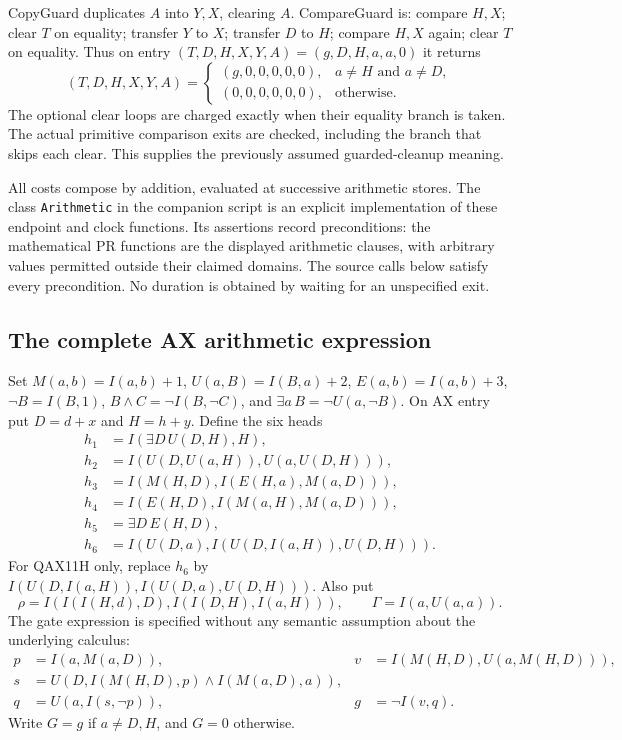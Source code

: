 CopyGuard duplicates $A$ into $Y,X$, clearing $A$.
CompareGuard is: compare $H,X$; clear $T$ on equality; transfer $Y$
to $X$; transfer $D$ to $H$; compare $H,X$ again; clear $T$ on equality.
Thus on entry $(T,D,H,X,Y,A)=(g,D,H,a,a,0)$ it returns
\[
 (T,D,H,X,Y,A)=
 \begin{cases}(g,0,0,0,0,0),&a\ne H\text{ and }a\ne D,\\
 (0,0,0,0,0,0),&\text{otherwise}.
 \end{cases}
\]
The optional clear loops are charged exactly when their equality branch
is taken.  The actual primitive comparison exits are checked, including
the branch that skips each clear.  This supplies the previously assumed
guarded-cleanup meaning.

All costs compose by addition, evaluated at successive arithmetic stores.
The class \texttt{Arithmetic} in the companion script is an explicit
implementation of these endpoint and clock functions.  Its assertions
record preconditions: the mathematical PR functions are the displayed
arithmetic clauses, with arbitrary values permitted outside their claimed
domains.  The source calls below satisfy every precondition.  No duration
is obtained by waiting for an unspecified exit.

\subsection{The complete AX arithmetic expression}

Set $M(a,b)=I(a,b)+1$, $U(a,B)=I(B,a)+2$, $E(a,b)=I(a,b)+3$,
$\neg B=I(B,1)$, $B\wedge C=\neg I(B,\neg C)$, and
$\exists a\,B=\neg U(a,\neg B)$.  On AX entry put $D=d+x$ and
$H=h+y$.  Define the six heads
\begin{align*}
 h_1&=I(\exists D\,U(D,H),H),\\
 h_2&=I(U(D,U(a,H)),U(a,U(D,H))),\\
 h_3&=I(M(H,D),I(E(H,a),M(a,D))),\\
 h_4&=I(E(H,D),I(M(a,H),M(a,D))),\\
 h_5&=\exists D\,E(H,D),\\
 h_6&=I(U(D,a),I(U(D,I(a,H)),U(D,H))).
\end{align*}
For QAX11H only, replace $h_6$ by
$I(U(D,I(a,H)),I(U(D,a),U(D,H)))$.
Also put
\[
 \rho=I(I(I(H,d),D),I(I(D,H),I(a,H))),\qquad
 \Gamma=I(a,U(a,a)).
\]
The gate expression is specified without any semantic assumption about
the underlying calculus:
\begin{align*}
 p&=I(a,M(a,D)),&v&=I(M(H,D),U(a,M(H,D))),\\
 s&=U(D,I(M(H,D),p)\wedge I(M(a,D),a)),\\
 q&=U(a,I(s,\neg p)),&g&=\neg I(v,q).
\end{align*}
Write $G=g$ if $a\ne D,H$, and $G=0$ otherwise.

